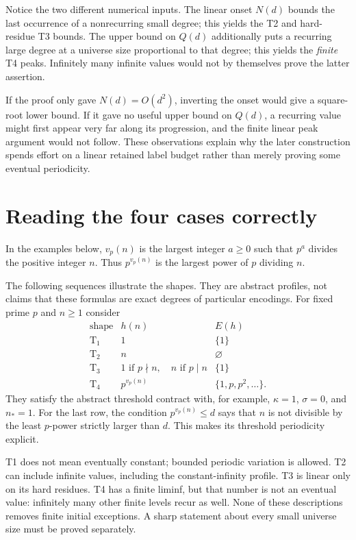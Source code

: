 \documentclass[11pt,a4paper,oneside,openany]{book}
\theoremstyle{definition}\newtheorem{definition}[theorem]{Definition}
\theoremstyle{remark}\newtheorem{remark}[theorem]{Remark}
\numberwithin{equation}{chapter}
\begin{document}
Notice the two different numerical inputs. The linear onset $N(d)$
bounds the last occurrence of a nonrecurring small degree; this yields
the T2 and hard-residue T3 bounds. The upper bound on $Q(d)$ additionally
puts a recurring large degree at a universe size proportional to that degree;
this yields the \emph{finite} T4 peaks. Infinitely many infinite values
would not by themselves prove the latter assertion.

If the proof only gave $N(d)=O(d^2)$, inverting the onset would give a
square-root lower bound. If it gave no useful upper bound on $Q(d)$,
a recurring value might first appear very far along its progression,
and the finite linear peak argument would not follow. These observations
explain why the later construction spends effort on a linear retained
label budget rather than merely proving some eventual periodicity.

\section{Reading the four cases correctly}
In the examples below, $v_p(n)$ is the largest integer $a\ge0$ such
that $p^a$ divides the positive integer $n$. Thus $p^{v_p(n)}$ is the
largest power of $p$ dividing $n$.

The following sequences illustrate the shapes. They are abstract
profiles, not claims that these formulas are exact degrees of particular
encodings. For fixed prime $p$ and $n\ge1$ consider
\[
 \begin{array}{c|c|c}
 \text{shape}&h(n)&E(h)\\\hline
 \mathrm T_1&1&\{1\}\\
 \mathrm T_2&n&\varnothing\\
 \mathrm T_3&1\text{ if }p\nmid n,\quad n\text{ if }p\mid n&\{1\}\\
 \mathrm T_4&p^{v_p(n)}&\{1,p,p^2,\ldots\}.
 \end{array}
\]
They satisfy the abstract threshold contract with, for example,
$\kappa=1$, $\sigma=0$, and $n_*=1$. For the last row, the condition
$p^{v_p(n)}\le d$ says that $n$ is not divisible by the least $p$-power
strictly larger than $d$. This makes its threshold periodicity explicit.

T1 does not mean eventually constant; bounded periodic variation is
allowed. T2 can include infinite values, including the constant-infinity
profile. T3 is linear only on its hard residues. T4 has a finite liminf,
but that number is not an eventual value: infinitely many other finite
levels recur as well. None of these descriptions removes finite initial
exceptions. A sharp statement about every small universe size must be proved
separately.
\end{document}
